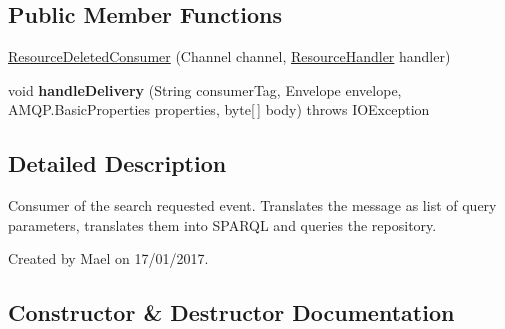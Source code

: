\subsection*{Public Member Functions}
\begin{DoxyCompactItemize}
\item 
\hyperlink{classeu_1_1h2020_1_1symbiote_1_1communication_1_1ResourceDeletedConsumer_a916388b648d7332a81aeca3d7f546485}{Resource\+Deleted\+Consumer} (Channel channel, \hyperlink{classeu_1_1h2020_1_1symbiote_1_1handlers_1_1ResourceHandler}{Resource\+Handler} handler)
\item 
void {\bfseries handle\+Delivery} (String consumer\+Tag, Envelope envelope, A\+M\+Q\+P.\+Basic\+Properties properties, byte\mbox{[}$\,$\mbox{]} body)  throws I\+O\+Exception \hypertarget{classeu_1_1h2020_1_1symbiote_1_1communication_1_1ResourceDeletedConsumer_af0058d865f7a3fc2ab0813a5e14f6b17}{}\label{classeu_1_1h2020_1_1symbiote_1_1communication_1_1ResourceDeletedConsumer_af0058d865f7a3fc2ab0813a5e14f6b17}

\end{DoxyCompactItemize}


\subsection{Detailed Description}
Consumer of the search requested event. Translates the message as list of query parameters, translates them into S\+P\+A\+R\+QL and queries the repository.

Created by Mael on 17/01/2017. 

\subsection{Constructor \& Destructor Documentation}
